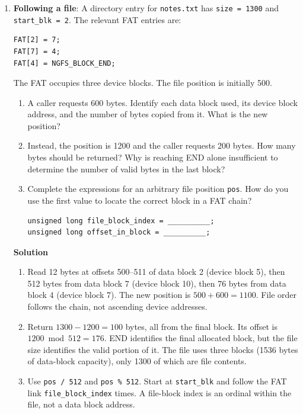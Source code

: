 \documentclass{article}
\newenvironment{solution}{\par\medskip\noindent\textbf{Solution}\par\smallskip}{\par}
\begin{document}
\begin{enumerate}
\newpage
\item \textbf{Following a file}: A directory entry for \texttt{notes.txt} has
\texttt{size = 1300} and \texttt{start\_blk = 2}. The relevant FAT entries are:
\begin{lstlisting}[style=CStyle]
FAT[2] = 7;
FAT[7] = 4;
FAT[4] = NGFS_BLOCK_END;
\end{lstlisting}
The FAT occupies three device blocks. The file position is initially 500.
\begin{enumerate}
\item A caller requests 600 bytes. Identify each data block used, its device
block address, and the number of bytes copied from it. What is the new position?
\item Instead, the position is 1200 and the caller requests 200 bytes.
How many bytes should be returned? Why is reaching END alone insufficient
to determine the number of valid bytes in the last block?
\item Complete the expressions for an arbitrary file position \texttt{pos}.
How do you use the first value to locate the correct block in a FAT chain?
\begin{lstlisting}[style=CStyle]
unsigned long file_block_index = __________;
unsigned long offset_in_block = __________;
\end{lstlisting}
\end{enumerate}
\begin{solution}
\begin{enumerate}
\item Read 12 bytes at offsets 500--511 of data block 2 (device block 5),
then 512 bytes from data block 7 (device block 10), then 76 bytes from
data block 4 (device block 7). The new position is $500+600=1100$.
File order follows the chain, not ascending device addresses.
\item Return $1300-1200=100$ bytes, all from the final block. Its offset is
$1200\bmod512=176$. END identifies the final allocated block, but the
file size identifies the valid portion of it. The file uses three blocks
(1536 bytes of data-block capacity), only 1300 of which are file contents.
\item Use \texttt{pos / 512} and \texttt{pos \% 512}. Start at
\texttt{start\_blk} and follow the FAT link \texttt{file\_block\_index}
times. A file-block index is an ordinal within the file, not a data block address.
\end{enumerate}
\end{solution}


\end{enumerate}
\end{document}
